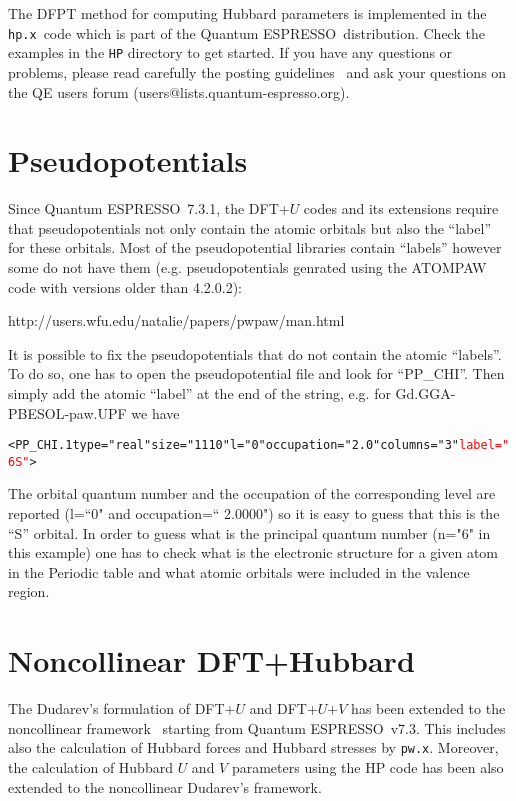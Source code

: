 \documentclass[12pt,a4paper]{article}
\def\version{7.3.1}
\def\qe{{\sc Quantum ESPRESSO}}
\def\hp{\texttt{hp.x}}
\begin{document}
The DFPT method for computing Hubbard parameters is implemented in the \hp\ code which is part of the \qe\ distribution. Check the examples in the \texttt{HP} directory to get started. If you have any questions or problems, please read carefully the posting guidelines~\cite{QE} and ask your questions on the QE users forum (users@lists.quantum-espresso.org). 


\section{Pseudopotentials}

Since \qe\ \version, the DFT+$U$ codes and its extensions require that pseudopotentials not only contain the atomic orbitals but also the ``label'' for these orbitals. Most of the pseudopotential libraries contain ``labels'' however some do not have them (e.g. pseudopotentials genrated using the ATOMPAW code with versions older than 4.2.0.2):\par 
\noindent
http://users.wfu.edu/natalie/papers/pwpaw/man.html
 
It is possible to fix the pseudopotentials that do not contain the atomic ``labels''. To do so, one has to open the pseudopotential file and look for ``PP\_CHI''. Then simply add the atomic ``label'' at the end of the string, e.g. for Gd.GGA-PBESOL-paw.UPF we have
\noindent
\begin{alltt}
	<PP_CHI.1 type="real" size="1110" l="0" occupation="2.0" columns="3" \textcolor{red}{label="6S"}>
\end{alltt}
The orbital quantum number and the occupation of the corresponding level are reported (l=``0" and occupation=`` 2.0000") so it is easy to guess that this is the ``S'' orbital. In order to guess what is the principal quantum number (n="6" in this example) one has to check what is the electronic structure for a given atom in the Periodic table and what atomic orbitals were included in the valence region. 


\section{Noncollinear DFT+Hubbard}

The Dudarev's formulation of DFT+$U$ and DFT+$U$+$V$ has been extended to the noncollinear framework~\cite{Binci:2023} starting from \qe\ v7.3. This includes also the calculation of Hubbard forces and Hubbard stresses by \texttt{pw.x}. Moreover, the calculation of Hubbard $U$ and $V$ parameters using the \textsc{HP} code has been also extended to the noncollinear Dudarev's framework.
\end{document}
